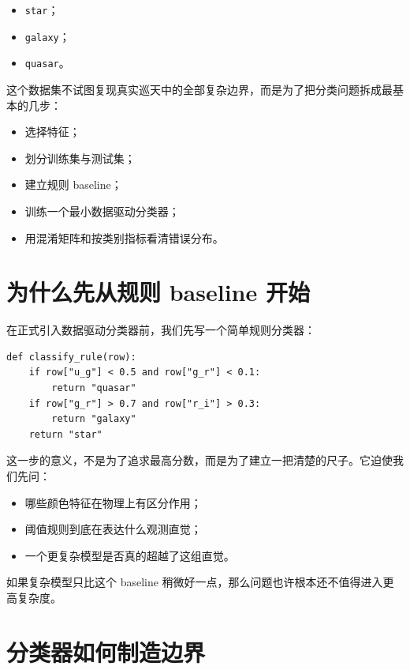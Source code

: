 \begin{itemize}
    \item \texttt{star}；
    \item \texttt{galaxy}；
    \item \texttt{quasar}。
\end{itemize}

这个数据集不试图复现真实巡天中的全部复杂边界，而是为了把分类问题拆成最基本的几步：

\begin{itemize}
    \item 选择特征；
    \item 划分训练集与测试集；
    \item 建立规则 baseline；
    \item 训练一个最小数据驱动分类器；
    \item 用混淆矩阵和按类别指标看清错误分布。
\end{itemize}

\section{为什么先从规则 baseline 开始}

在正式引入数据驱动分类器前，我们先写一个简单规则分类器：

\begin{examplebox}[规则 baseline]
\begin{lstlisting}[style=pythonstyle]
def classify_rule(row):
    if row["u_g"] < 0.5 and row["g_r"] < 0.1:
        return "quasar"
    if row["g_r"] > 0.7 and row["r_i"] > 0.3:
        return "galaxy"
    return "star"
\end{lstlisting}
\end{examplebox}

这一步的意义，不是为了追求最高分数，而是为了建立一把清楚的尺子。它迫使我们先问：

\begin{itemize}
    \item 哪些颜色特征在物理上有区分作用；
    \item 阈值规则到底在表达什么观测直觉；
    \item 一个更复杂模型是否真的超越了这组直觉。
\end{itemize}

如果复杂模型只比这个 baseline 稍微好一点，那么问题也许根本还不值得进入更高复杂度。

\section{分类器如何制造边界}

